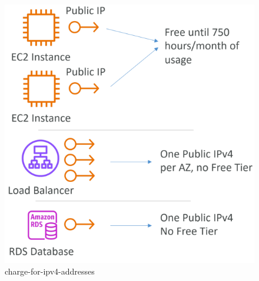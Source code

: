 \begin{figure}[htbp]
	\centering
	\includegraphics[width=1\linewidth]{images/charge-for-ipv4-addresses.png}
	\caption{charge-for-ipv4-addresses}
	\label{fig:charge-for-ipv4-addresses}
\end{figure}


















































